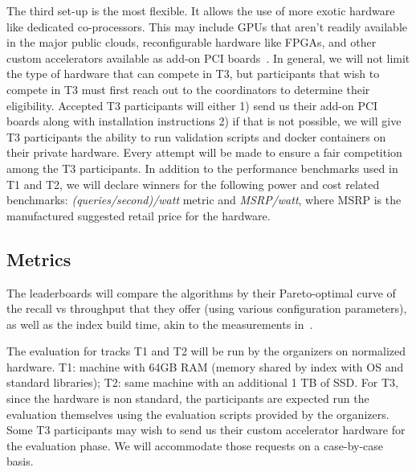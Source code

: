 The third set-up is the most flexible. It allows the use of more exotic 
hardware like dedicated co-processors. %
This may include GPUs that aren't readily available in the major public clouds, reconfigurable hardware like FPGAs, and other custom accelerators 
available as add-on PCI boards~\cite{amdvid,applegpu,xilinxfpga,flexfpga}.  In general, we will not limit the type of hardware that can compete in T3, but 
participants that wish to compete in T3 must first reach out to the coordinators to determine their eligibility.  Accepted T3 participants
will either 1) send us their add-on PCI boards along with installation instructions 2) if that is not possible, we will give
T3 participants the ability to run validation scripts and docker containers on their private hardware.  Every attempt will
be made to ensure a fair competition among the T3 participants.  In addition to the performance benchmarks used in T1 and T2, we will declare
winners for the following power and cost related benchmarks: \emph{(queries/second)/watt} metric and \emph{MSRP/watt}, where MSRP is the
manufactured suggested retail price for the hardware.


\subsection{Metrics}
\label{metrics}


The leaderboards will compare the algorithms by their Pareto-optimal
curve of the recall vs throughput that they offer (using various
configuration parameters), as well as the index build time, akin to
the measurements in~\cite{Benchmark}.

The evaluation for tracks T1 and T2 will be run by the organizers on
normalized hardware.  T1: machine with 64GB RAM (memory shared by
index with OS and standard libraries); T2: same machine with an
additional 1 TB of SSD.  For T3, since the hardware is non standard,
the participants are expected run the evaluation themselves using the
evaluation scripts provided by the organizers.  Some T3 participants
may wish to send us their custom accelerator hardware for the
evaluation phase.  We will accommodate those requests on a case-by-case
basis.




